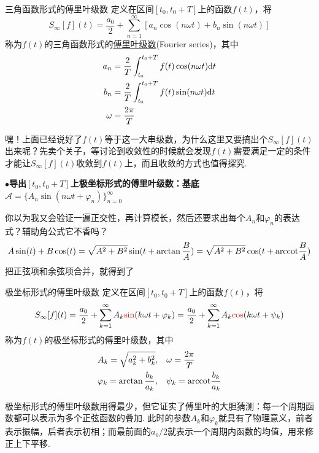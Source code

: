 \begin{definition}{三角函数形式的傅里叶级数}
    定义在区间\([t_0,t_0+T]\)上的函数\(f(t)\)，将
    \[S_{\infty}[f](t) = \frac{a_0}{2}+\sum_{n=1}^{\infty} \left[a_n\cos(n\omega t)+b_n\sin(n\omega t)\right]\]
    称为\(f(t)\)的三角函数形式的\uline{傅里叶级数}(Fourier series)，其中
    \begin{align*}
        a_n &= \frac{2}{T}\int_{t_0}^{t_0+T} f(t)\cos(n\omega t){\rm d}t \\
        b_n &= \frac{2}{T}\int_{t_0}^{t_0+T} f(t)\sin(n\omega t){\rm d}t \\
        \omega &= \frac{2\pi}{T}
    \end{align*}
\end{definition}

嘿！上面已经说好了\(f(t)\)等于这一大串级数，为什么这里又要搞出个\(S_{\infty}[f](t)\)出来呢？先卖个关子，等讨论到收敛性的时候就会发现\(f(t)\)需要满足一定的条件才能让\(S_{\infty}[f](t)\)收敛到\(f(t)\)上，而且收敛的方式也值得探究.

\vspace{1cm}
\noindent \textbf{
\(\bullet\)导出\([t_0, t_0+T]\)上极坐标形式的傅里叶级数：基底\(\mathcal{A}=\{A_n\sin(n\omega t+\varphi_n)\}_{n=0}^{\infty}\)
}

你以为我又会验证一遍正交性，再计算模长，然后还要求出每个\(A_n\)和\(\varphi_n\)的表达式？辅助角公式它不香吗？
\[A\sin(t)+B\cos(t)=\sqrt{A^2+B^2}\sin(t+\arctan\frac{B}{A}) = \sqrt{A^2+B^2}\cos(t+{\rm arccot}\frac{B}{A})\]
把正弦项和余弦项合并，就得到了
\begin{definition}{极坐标形式的傅里叶级数}
    定义在区间\([t_0,t_0+T]\)上的函数\(f(t)\)，将
    \[S_{\infty}[f](t) = \frac{a_0}{2}+\sum_{k=1}^{\infty} A_k{\color{red}\sin}(k\omega t+\varphi_k) = \frac{a_0}{2}+\sum_{k=1}^{\infty} A_k{\color{red}\cos}(k\omega t+\psi_k)\]
    称为\(f(t)\)的极坐标形式的傅里叶级数，其中
    \[
        \begin{aligned}
            & A_k = \sqrt{a_k^2+b_k^2},  && \omega = \frac{2\pi}{T} \\
            & \varphi_k = \arctan\frac{b_k}{a_k}, && \psi_k = {\rm arccot}\frac{b_k}{a_k}
        \end{aligned}
    \]
\end{definition}

极坐标形式的傅里叶级数用得最少，但它证实了傅里叶的大胆猜测：每一个周期函数都可以表示为多个正弦函数的叠加. 此时的参数\(A_k\)和\(\varphi_k\)就具有了物理意义，前者表示振幅，后者表示初相；而最前面的\(a_0/2\)就表示一个周期内函数的均值，用来修正上下平移.

